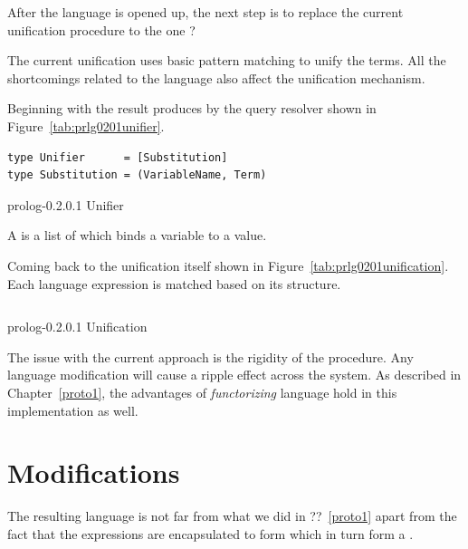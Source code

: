 \documentclass[thesis-solanki.tex]{subfiles}
\begin{document}
After the language is opened up, the next step is to replace the current unification procedure to the one {\Huge
  ?}


The current unification uses basic pattern matching to unify the terms. All the shortcomings related to the language also affect the
unification mechanism.

Beginning with the result produces by the query resolver shown in Figure~\ref{tab:prlg0201unifier}.
\begin{code-list}[h]
\begin{verbatim}
type Unifier      = [Substitution]
type Substitution = (VariableName, Term)
\end{verbatim}
\caption{prolog-0.2.0.1 Unifier}
\label{tab:prlg0201unifier}
\end{code-list}
A  is a list of  which binds a variable to a value.

Coming back to the unification itself shown in Figure~\ref{tab:prlg0201unification}.
Each language expression is matched based on its structure.

\begin{code-list}[h]
  \begin{singlespace}
    \inputminted[linenos]{haskell}{haskell-proto2-unification-lion.hs}
  \end{singlespace}
\caption{prolog-0.2.0.1 Unification}
\label{tab:prlg0201unification}
\end{code-list}

The issue with the current approach is the rigidity of the procedure.
Any language modification will cause a ripple effect across the system.
As described in Chapter~\ref{proto1}, the advantages of \textit{functorizing} language hold in this implementation
as well.


\section{Modifications}
The resulting language is not far from what we did in {\Large ?\LARGE ?}~\ref{proto1}
apart from the fact that the  expressions are encapsulated
to form  which in turn form a .
\end{document}
